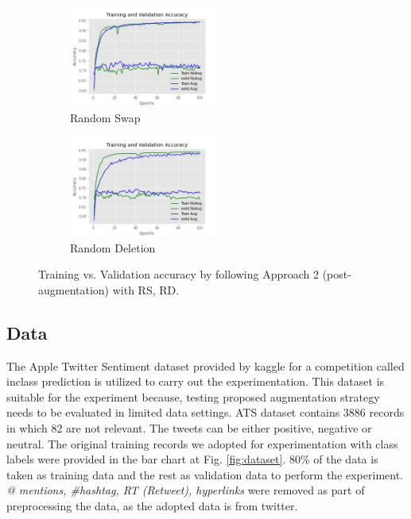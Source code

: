 \documentclass{article}
\begin{document}
\begin{figure}
  \begin{subfigure}{6cm}
    \centering\includegraphics[width=5cm]{accuracyrandomswapA2.jpg}
    \caption{Random Swap}
  \end{subfigure}
  \begin{subfigure}{6cm}
    \centering\includegraphics[width=5cm]{accuracyrandomdeleteA2.jpg}
    \caption{Random Deletion}
  \end{subfigure}
  \caption{Training vs. Validation accuracy by following Approach 2 (post-augmentation) with RS, RD.}
  \label{fig:postaugmentA2}
\end{figure}


\subsection{Data}
The Apple Twitter Sentiment dataset provided by kaggle for a competition called inclass prediction is utilized to carry out the experimentation. This dataset is suitable for the experiment because, testing proposed augmentation strategy needs to be evaluated in limited data settings. ATS dataset contains 3886 records in which 82 are not relevant. The tweets can be either positive, negative or neutral. The original training records we adopted for experimentation with class labels were provided in the bar chart at Fig. \ref{fig:dataset}. 80\% of the data is taken as training data and the rest as validation data to perform the experiment. \textit{ \\@ mentions, \#hashtag, RT (Retweet), hyperlinks} were removed as part of preprocessing the data, as the adopted data is from twitter.
\end{document}
